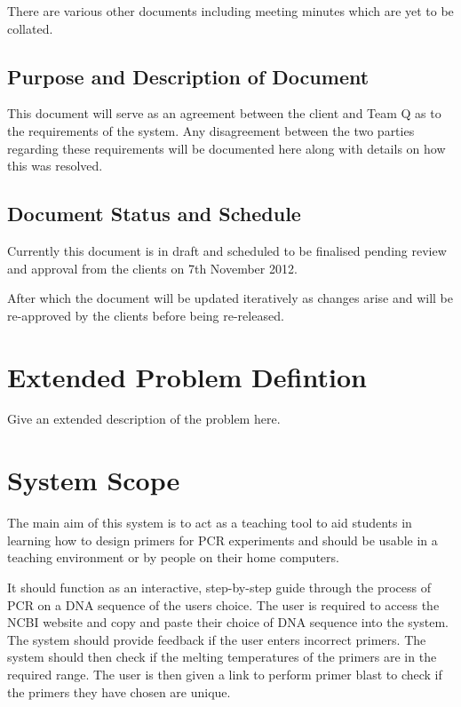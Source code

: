 \documentclass{l3deliverable}
\begin{document}
There are various other documents including meeting minutes which are yet to
be collated.

\subsection{Purpose and Description of Document}

This document will serve as an agreement between the client and Team
Q as to the requirements of the system. Any disagreement between the
two parties regarding these requirements will be documented here along
with details on how this was resolved.

\subsection{Document Status and Schedule}

Currently this document is in draft and scheduled to be finalised
pending review and approval from the clients on 7th November 2012.

After which the document will be updated iteratively as changes
arise and will be re-approved by the clients before being re-released.

\section{Extended Problem Defintion}
\label{sec:extendedDefinition}


Give an extended description of the problem here.


\section{System Scope}

The main aim of this system is to act as a teaching tool to aid students
in learning how to design primers for PCR experiments and should be
usable in a teaching environment or by people on their home computers.

It should function as an interactive, step-by-step guide through the
process of PCR on a DNA sequence of the users choice. The user is
required to access the NCBI website and copy and paste their choice of
DNA sequence into the system. The system should provide feedback if the
user enters incorrect primers. The system should then check if the
melting temperatures of the primers are in the required range. The user
is then given a link to perform primer blast to check if the primers
they have chosen are unique.
\end{document}
